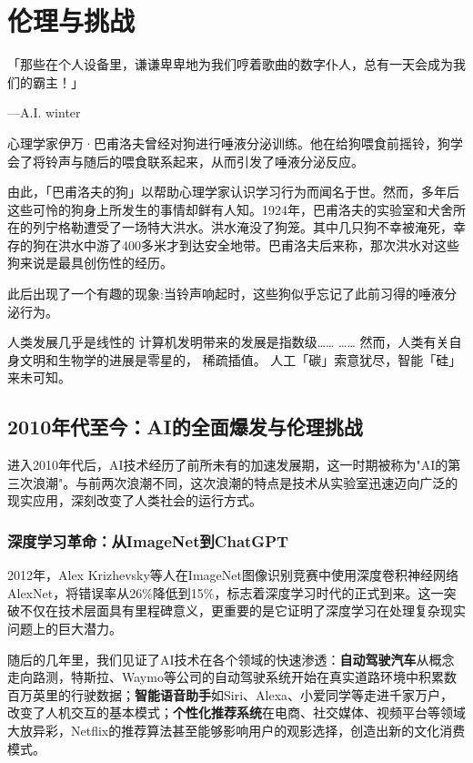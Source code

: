 \chapter{伦理与挑战}
「那些在个人设备里，谦谦卑卑地为我们哼着歌曲的数字仆人，总有一天会成为我们的霸主！」
\begin{flushright}
---A.I. winter
\end{flushright}

心理学家伊万·巴甫洛夫曾经对狗进行唾液分泌训练。他在给狗喂食前摇铃，狗学会了将铃声与随后的喂食联系起来，从而引发了唾液分泌反应。

由此，「巴甫洛夫的狗」以帮助心理学家认识学习行为而闻名于世。然而，多年后这些可怜的狗身上所发生的事情却鲜有人知。1924年，巴甫洛夫的实验室和犬舍所在的列宁格勒遭受了一场特大洪水。洪水淹没了狗笼。其中几只狗不幸被淹死，幸存的狗在洪水中游了400多米才到达安全地带。巴甫洛夫后来称，那次洪水对这些狗来说是最具创伤性的经历。

此后出现了一个有趣的现象:当铃声响起时，这些狗似乎忘记了此前习得的唾液分泌行为。

人类发展几乎是线性的
计算机发明带来的发展是指数级……
……
然而，人类有关自身文明和生物学的进展是零星的， 稀疏插值。
人工「碳」索意犹尽，智能「硅」来未可知。

\section{2010年代至今：AI的全面爆发与伦理挑战}

进入2010年代后，AI技术经历了前所未有的加速发展期，这一时期被称为"AI的第三次浪潮"。与前两次浪潮不同，这次浪潮的特点是技术从实验室迅速迈向广泛的现实应用，深刻改变了人类社会的运行方式。

\subsection{深度学习革命：从ImageNet到ChatGPT}

2012年，Alex Krizhevsky等人在ImageNet图像识别竞赛中使用深度卷积神经网络AlexNet，将错误率从26\%降低到15\%，标志着深度学习时代的正式到来。这一突破不仅在技术层面具有里程碑意义，更重要的是它证明了深度学习在处理复杂现实问题上的巨大潜力。

随后的几年里，我们见证了AI技术在各个领域的快速渗透：{\bf 自动驾驶汽车}从概念走向路测，特斯拉、Waymo等公司的自动驾驶系统开始在真实道路环境中积累数百万英里的行驶数据；{\bf 智能语音助手}如Siri、Alexa、小爱同学等走进千家万户，改变了人机交互的基本模式；{\bf 个性化推荐系统}在电商、社交媒体、视频平台等领域大放异彩，Netflix的推荐算法甚至能够影响用户的观影选择，创造出新的文化消费模式。

